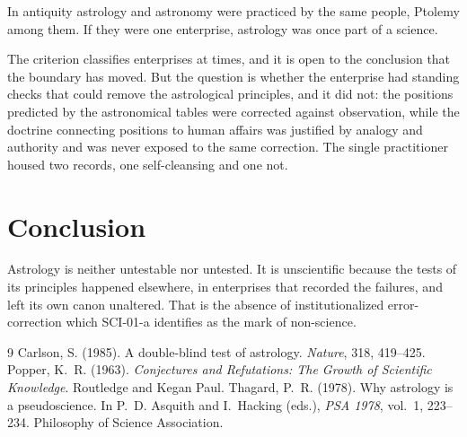 \documentclass{situationist-preprint}
\begin{document}
\begin{objection}
In antiquity astrology and astronomy were practiced by the same people, Ptolemy among them. If they were one enterprise, astrology was once part of a science.
\end{objection}

\begin{reply}
The criterion classifies enterprises at times, and it is open to the conclusion that the boundary has moved. But the question is whether the enterprise had standing checks that could remove the astrological principles, and it did not: the positions predicted by the astronomical tables were corrected against observation, while the doctrine connecting positions to human affairs was justified by analogy and authority and was never exposed to the same correction. The single practitioner housed two records, one self-cleansing and one not.
\end{reply}

\section{Conclusion}\label{s:conclusion}

Astrology is neither untestable nor untested. It is unscientific because the tests of its principles happened elsewhere, in enterprises that recorded the failures, and left its own canon unaltered. That is the absence of institutionalized error-correction which SCI-01-a identifies as the mark of non-science.

\begin{thebibliography}{9}
 Carlson, S. (1985). A double-blind test of astrology. \emph{Nature}, 318, 419--425.
 Popper, K.~R. (1963). \emph{Conjectures and Refutations: The Growth of Scientific Knowledge}. Routledge and Kegan Paul.
 Thagard, P.~R. (1978). Why astrology is a pseudoscience. In P.~D. Asquith and I.~Hacking (eds.), \emph{PSA 1978}, vol.~1, 223--234. Philosophy of Science Association.
\end{thebibliography}
\end{document}
